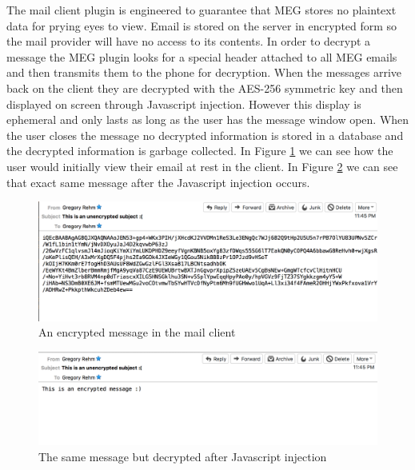 \documentclass[10pt]{article}
\begin{document}
\begin{multicols}{2}
\par The mail client plugin is engineered to guarantee that MEG stores no plaintext data for prying eyes to view. Email is stored on the server in encrypted form so the mail provider will have no access to its contents. In order to decrypt a message the MEG plugin looks for a special header attached to all MEG emails and then transmits them to the phone for decryption. When the messages arrive back on the client they are decrypted with the AES-256 symmetric key and then displayed on screen through Javascript injection. However this display is ephemeral and only lasts as long as the user has the message window open. When the user closes the message no decrypted information is stored in a database and the decrypted information is garbage collected. In Figure \ref{fig:Encrypted-client} we can see how the user would initially view their email at rest in the client. In Figure \ref{fig:Decrypted-client} we can see that exact same message after the Javascript injection occurs.
\end{multicols}
\begin{figure}[h]
    \includegraphics[scale=.6]{encrypted-msg.png}
    \caption{An encrypted message in the mail client}
    \label{fig:Encrypted-client}
\end{figure}
\begin{figure}[h]
    \includegraphics[scale=.6]{decrypted-msg.png}
    \caption{The same message but decrypted after Javascript injection}
    \label{fig:Decrypted-client}
\end{figure}
\end{document}
